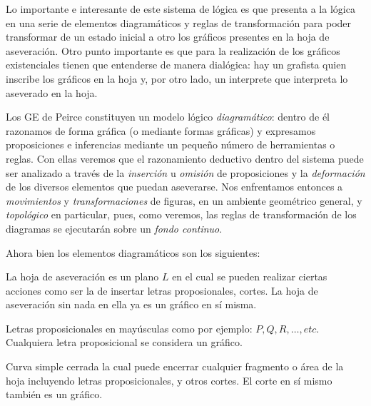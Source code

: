 \documentclass[
	fontsize=10pt, %
	twoside=false, %
	secnumdepth=1, %
	abstract=true, %
]{kaohandt}
\begin{document}
Lo importante e interesante de este sistema de lógica es que presenta a la lógica en una serie de elementos diagramáticos y reglas de transformación para poder transformar de un estado inicial a otro los gráficos presentes en la hoja de aseveración. Otro punto importante es que para la realización de los gráficos existenciales tienen que entenderse de manera dialógica: hay un grafista quien inscribe los gráficos en la hoja y, por otro lado, un interprete que interpreta lo aseverado en la hoja. 

Los GE de Peirce constituyen un modelo lógico \emph{diagramático}: dentro de él razonamos de forma gráfica (o mediante formas gráficas) y expresamos proposiciones e inferencias mediante un pequeño número de herramientas o reglas. Con ellas veremos que el razonamiento deductivo dentro del sistema puede ser analizado a través de la \emph{ inserción} u \emph{ omisión} de proposiciones y la \emph{ deformación} de los diversos elementos que puedan aseverarse. Nos enfrentamos entonces a \emph{ movimientos} y \emph{ transformaciones} de figuras, en un ambiente geométrico general, y \emph{ topológico} en particular, pues, como veremos, las reglas de transformación de los diagramas se ejecutarán sobre un \emph{ fondo continuo}.

Ahora bien los elementos diagramáticos son los siguientes:

\begin{definition}
	La hoja de aseveración es un plano $ L $ en el cual se pueden realizar ciertas acciones como ser la de insertar letras proposionales, cortes. La hoja de aseveración sin nada en ella ya es un gráfico en sí misma.
\end{definition}

\begin{definition}
	Letras proposicionales en mayúsculas como por ejemplo: $ P, Q, R, \dots, etc $. Cualquiera letra proposicional se considera un gráfico.
\end{definition}

\begin{definition}[Corte]
	Curva simple cerrada la cual puede encerrar cualquier fragmento o área de la hoja incluyendo letras proposicionales, y otros cortes. El corte en sí mismo también es un gráfico.
\end{definition}
\end{document}
